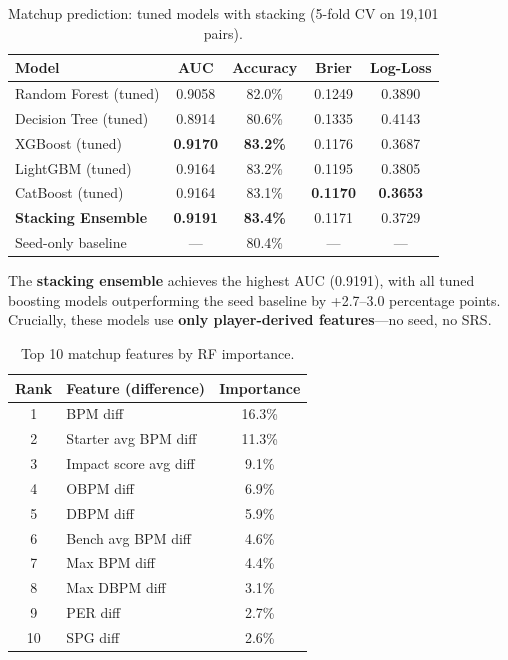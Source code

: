 \documentclass[12pt, a4paper]{article}
\begin{document}
\begin{table}[H]
\centering
\caption{Matchup prediction: tuned models with stacking (5-fold CV on 19,101 pairs).}
\label{tab:matchup}
\begin{tabular}{@{}lcccc@{}}
\toprule
\textbf{Model} & \textbf{AUC} & \textbf{Accuracy} & \textbf{Brier} & \textbf{Log-Loss} \\
\midrule
Random Forest (tuned) & 0.9058 & 82.0\% & 0.1249 & 0.3890 \\
Decision Tree (tuned) & 0.8914 & 80.6\% & 0.1335 & 0.4143 \\
XGBoost (tuned) & \textbf{0.9170} & \textbf{83.2\%} & 0.1176 & 0.3687 \\
LightGBM (tuned) & 0.9164 & 83.2\% & 0.1195 & 0.3805 \\
CatBoost (tuned) & 0.9164 & 83.1\% & \textbf{0.1170} & \textbf{0.3653} \\
\textbf{Stacking Ensemble} & \textbf{0.9191} & \textbf{83.4\%} & 0.1171 & 0.3729 \\
\midrule
Seed-only baseline & --- & 80.4\% & --- & --- \\
\bottomrule
\end{tabular}
\end{table}

The \textbf{stacking ensemble} achieves the highest AUC (0.9191), with all tuned boosting models outperforming the seed baseline by +2.7--3.0 percentage points. Crucially, these models use \textbf{only player-derived features}---no seed, no SRS.

\begin{table}[H]
\centering
\caption{Top 10 matchup features by RF importance.}
\begin{tabular}{@{}clc@{}}
\toprule
\textbf{Rank} & \textbf{Feature (difference)} & \textbf{Importance} \\
\midrule
1 & BPM diff & 16.3\% \\
2 & Starter avg BPM diff & 11.3\% \\
3 & Impact score avg diff & 9.1\% \\
4 & OBPM diff & 6.9\% \\
5 & DBPM diff & 5.9\% \\
6 & Bench avg BPM diff & 4.6\% \\
7 & Max BPM diff & 4.4\% \\
8 & Max DBPM diff & 3.1\% \\
9 & PER diff & 2.7\% \\
10 & SPG diff & 2.6\% \\
\bottomrule
\end{tabular}
\end{table}
\end{document}
